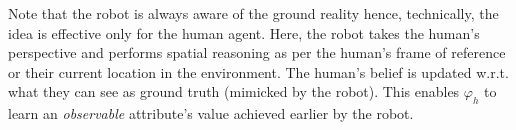 \documentclass[letterpaper]{article} %
\begin{document}

% 
% 


Note that the robot is always aware of the ground reality hence, technically, the idea 
is effective only for the human agent. Here, the robot takes the human's perspective and performs spatial reasoning as per the human's frame of reference or their current location in the environment. 
The human's belief is updated w.r.t. what they can see as ground truth (mimicked by the robot).
This enables $\varphi_h$ to learn an \textit{observable} attribute's value achieved earlier by the robot.
% 
\end{document}
